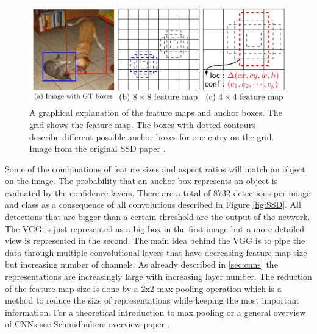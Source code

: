 \begin{figure}[!htb]
	\centering
	\includegraphics[width=\textwidth]{images/SSD_feature_maps}
	\caption{A graphical explanation of the feature maps and anchor boxes. The grid shows the feature map. The boxes with dotted contours describe different possible anchor boxes for one entry on the grid. Image from the original SSD paper \cite{SSD}.}
	\label{fig:SSD_feature_maps}
\end{figure}

Some of the combinations of feature sizes and aspect ratios will match an object on the image. The probability that an anchor box represents an object is evaluated by the confidence layers. There are a total of 8732 detections per image and class as a consequence of all convolutions described in Figure \ref{fig:SSD}. All detections that are bigger than a certain threshold are the output of the network. The VGG is just represented as a big box in the first image but a more detailed view is represented in the second. The main idea behind the VGG is to pipe the data through multiple convolutional layers that have decreasing feature map size but increasing number of channels. As already described in \ref{sec:cnns} the representations are increasingly large with increasing layer number. The reduction of the feature map size is done by a 2x2 max pooling operation which is a method to reduce the size of representations while keeping the most important information. For a theoretical introduction to max pooling or a general overview of CNNs see Schmidhubers overview paper \cite{SchmidhuberOverview}. 


